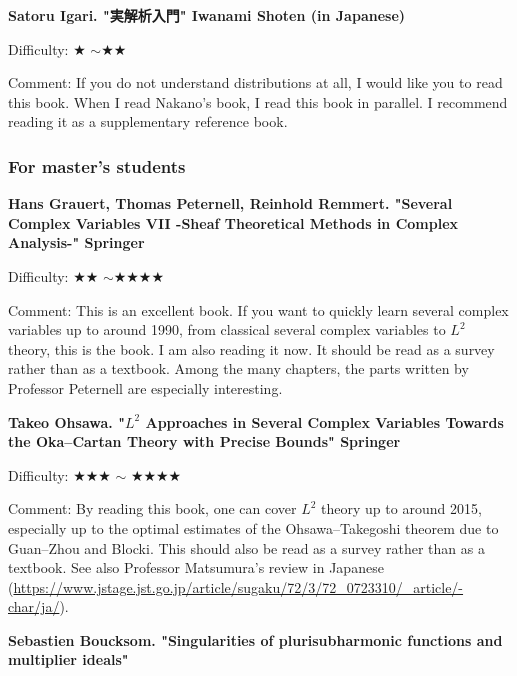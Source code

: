 \textbf{Satoru Igari. "実解析入門" Iwanami Shoten (in Japanese)}  　\vspace{-6pt} 

Difficulty: ★ $\sim$★★ 　\vspace{-6pt} 

Comment: If you do not understand distributions at all, I would like you to read this book. When I read Nakano's book, I read this book in parallel. I recommend reading it as a supplementary reference book.

\subsubsection{For master's students}

\textbf{Hans Grauert, Thomas Peternell, Reinhold Remmert. "Several Complex Variables VII -Sheaf Theoretical Methods in Complex Analysis-" Springer}  　\vspace{-6pt} 

Difficulty: ★★ $\sim$★★★★ 　\vspace{-6pt} 

Comment: This is an excellent book. If you want to quickly learn several complex variables up to around 1990, from classical several complex variables to $L^2$ theory, this is the book. I am also reading it now. It should be read as a survey rather than as a textbook. Among the many chapters, the parts written by Professor Peternell are especially interesting.
\vspace{8pt}

\textbf{Takeo Ohsawa.  "$L^2$ Approaches in Several Complex Variables
Towards the Oka–Cartan Theory with Precise Bounds" Springer}  　\vspace{-6pt} 

Difficulty: ★★★ $\sim$ ★★★★  　\vspace{-6pt} 

Comment: By reading this book, one can cover $L^2$ theory up to around 2015, especially up to the optimal estimates of the Ohsawa--Takegoshi theorem due to Guan--Zhou and Blocki. This should also be read as a survey rather than as a textbook. See also Professor Matsumura's review in Japanese (\url{https://www.jstage.jst.go.jp/article/sugaku/72/3/72_0723310/_article/-char/ja/}).
\vspace{8pt}

\textbf{Sebastien Boucksom. "Singularities of plurisubharmonic functions and multiplier ideals"}  　\vspace{-6pt} 

